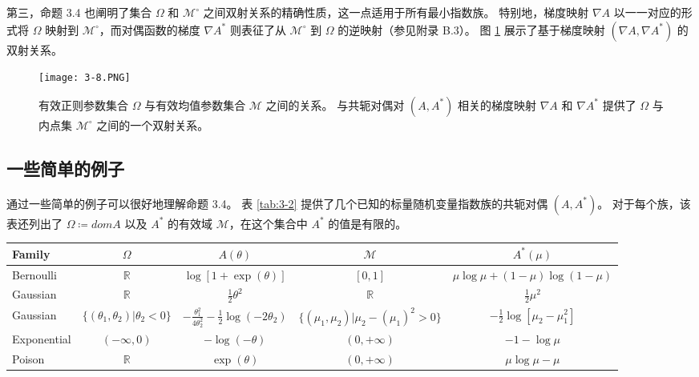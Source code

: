 第三，命题 3.4 也阐明了集合 $\Omega$ 和 $\mathcal{M}^\circ$ 之间双射关系的精确性质，这一点适用于所有最小指数族。
特别地，梯度映射 $\nabla A$ 以一一对应的形式将 $\Omega$ 映射到 $\mathcal{M}^\circ$，而对偶函数的梯度 $\nabla A^*$ 则表征了从 $\mathcal{M}^\circ$ 到 $\Omega$ 的逆映射（参见附录 B.3）。
图 \ref{fig:3-8} 展示了基于梯度映射 $(\nabla A, \nabla A^*)$ 的双射关系。

\begin{figure}[htbp]
    \centering
    \texttt{[image: 3-8.PNG]}
    \caption{
        有效正则参数集合 $\Omega$ 与有效均值参数集合 $\mathcal{M}$ 之间的关系。
        与共轭对偶对 $(A, A^*)$ 相关的梯度映射 $\nabla A$ 和 $\nabla A^*$ 提供了 $\Omega$ 与内点集 $\mathcal{M}^\circ$ 之间的一个双射关系。
    }\label{fig:3-8}
\end{figure}

\subsection{一些简单的例子}

通过一些简单的例子可以很好地理解命题 3.4。
表 \ref{tab:3-2} 提供了几个已知的标量随机变量指数族的共轭对偶 $(A, A^*)$。
对于每个族，该表还列出了 $\Omega \coloneqq dom A$ 以及 $A^*$ 的有效域 $\mathcal{M}$，在这个集合中 $A^*$ 的值是有限的。

\begin{sidewaystable}[htbp]
\caption{
    几个常见的标量指数族的共轭对偶关系
}\label{tab:3-2}
\centering
\begin{tabular}{lcccc}
    \hline
    Family & $\Omega$ & $A(\theta)$ & $\mathcal{M}$ & $A^*(\mu)$ \\
    \hline
    Bernoulli & $\mathbb{R}$ & $\log[1+\exp(\theta)]$ & $[0, 1]$ & $\mu\log\mu + (1-\mu)\log(1-\mu)$ \\
    Gaussian & $\mathbb{R}$ & $\frac{1}{2}\theta^2$ & $\mathbb{R}$ & $\frac{1}{2}\mu^2$ \\
    Gaussian & $\{(\theta_1, \theta_2)| \theta_2 < 0\}$ & $-\frac{\theta_1^2}{4\theta_2^2} - \frac{1}{2}\log{(-2\theta_2)}$ & $\{(\mu_1, \mu_2)| \mu_2 - (\mu_1)^2 > 0\}$ & $-\frac{1}{2}\log[\mu_2 - \mu_1^2]$ \\
    Exponential & $(-\infty, 0)$ & $-\log(-\theta)$ & $(0, +\infty)$ & $-1 - \log\mu$ \\
    Poison & $\mathbb{R}$ & $\exp(\theta)$ & $(0, +\infty)$ & $\mu\log\mu -\mu$ \\
    \hline
\end{tabular}
\end{sidewaystable}

